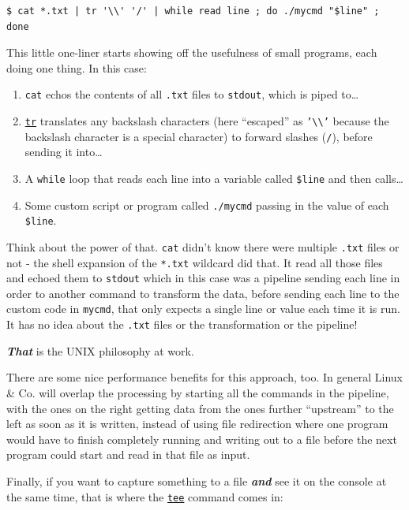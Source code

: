 \documentclass[10pt,]{book}
\numberwithin{figure}{chapter}
\begin{document}
\begin{verbatim}
$ cat *.txt | tr '\\' '/' | while read line ; do ./mycmd "$line" ; done
\end{verbatim}

This little one-liner starts showing off the usefulness of small
programs, each doing one thing. In this case:

\begin{enumerate}
\def\labelenumi{\arabic{enumi}.}
\item
  \texttt{cat} echos the contents of all \texttt{.txt} files to
  \texttt{stdout}, which is piped to\ldots{}
\item
  \href{http://linux.die.net/man/1/tr}{\texttt{tr}} translates any
  backslash characters (here ``escaped'' as
  \texttt{'\textbackslash{}\textbackslash{}'} because the backslash
  character is a special character) to forward slashes (\texttt{/}),
  before sending it into\ldots{}
\item
  A \texttt{while} loop that reads each line into a variable called
  \texttt{\$line} and then calls\ldots{}
\item
  Some custom script or program called \texttt{./mycmd} passing in the
  value of each \texttt{\$line}.
\end{enumerate}

Think about the power of that. \texttt{cat} didn't know there were
multiple \texttt{.txt} files or not - the shell expansion of the
\texttt{*.txt} wildcard did that. It read all those files and echoed
them to \texttt{stdout} which in this case was a pipeline sending each
line in order to another command to transform the data, before sending
each line to the custom code in \texttt{mycmd}, that only expects a
single line or value each time it is run. It has no idea about the
\texttt{.txt} files or the transformation or the pipeline!

\textbf{\emph{That}} is the UNIX philosophy at work.

There are some nice performance benefits for this approach, too. In
general Linux \& Co. will overlap the processing by starting all the
commands in the pipeline, with the ones on the right getting data from
the ones further ``upstream'' to the left as soon as it is written,
instead of using file redirection where one program would have to finish
completely running and writing out to a file before the next program
could start and read in that file as input.

Finally, if you want to capture something to a file \textbf{\emph{and}}
see it on the console at the same time, that is where the
\href{http://linux.die.net/man/1/tee}{\texttt{tee}} command comes in:
\end{document}
